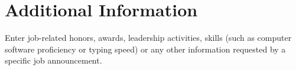 
\section{Additional Information}

\parindent 0.0cm %
Enter job-related honors, awards, leadership activities, skills (such as computer software proficiency or typing speed) or any other information requested by a specific job announcement.